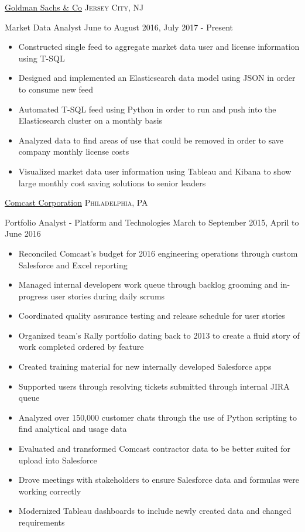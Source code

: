 \documentclass[10pt,letterpaper]{article}
\begin{document}
\headedsection  %
  {\href{http://www.goldmansachs.com/}{Goldman Sachs \& Co}}
  {\textsc{Jersey City, NJ}} {%
  \headedsubsection
    {Market Data  Analyst}
    {June to August 2016, July 2017 - Present}
    {\begin{itemize}
    \item Constructed single feed to aggregate  market data user and license information using T-SQL
    \item Designed and implemented an Elasticsearch data model using JSON in order to consume new feed
    \item Automated T-SQL feed using Python in order to run and push into the Elasticsearch cluster on a monthly basis
    \item Analyzed data to find areas of use that could be removed in order to save company monthly license costs
    \item Visualized market data user information using Tableau and Kibana to show large monthly cost saving solutions to senior leaders
    \end{itemize}}
}

\headedsection  %
  {\href{http://corporate.comcast.com//}{Comcast Corporation}}
  {\textsc{Philadelphia, PA}} {%
  \headedsubsection
    {Portfolio Analyst - Platform and Technologies}
    {March to September 2015, April to June 2016}
    {\begin{itemize}
    \item Reconciled Comcast's budget for 2016 engineering operations through custom Salesforce and Excel reporting
    \item Managed internal developers work queue through backlog grooming and in-progress user stories during daily scrums
    \item Coordinated quality assurance testing and release schedule for user stories
    \item Organized team's Rally portfolio dating back to 2013 to create a fluid story of work completed ordered by feature
    \item Created training material for new internally developed Salesforce apps
    \item Supported users through resolving tickets submitted through internal JIRA queue
    \item Analyzed over 150,000 customer chats through the use of Python scripting to find analytical and usage data
    \item Evaluated and transformed Comcast contractor data to be better suited for upload into Salesforce
    \item Drove meetings with stakeholders to ensure Salesforce data and formulas were working correctly
    \item Modernized Tableau dashboards to include newly created data and changed requirements
    \end{itemize}}
}
\end{document}
